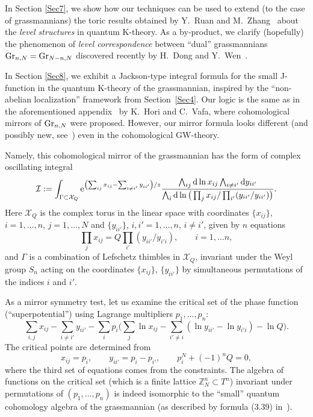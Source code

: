 \documentclass[pdftex]{sigma}
\numberwithin{equation}{section}
\def\I{\mathcal I}
\def\X{\mathcal X}
\def\ZZ{\mathbb Z}
\begin{document}
In Section \ref{Sec7}, we show how our techniques can be used to extend (to the case of grassmannians) the toric results obtained by Y.~Ruan and M.~Zhang~\cite{R-Z} about the {\em level structures} in quantum \mbox{K-theory}. As a by-product, we clarify (hopefully) the phenomenon of {\em level correspondence} between ``dual'' grassmannians ${\rm Gr}_{n,N}={\rm Gr}_{N-n,N}$ discovered recently by H.~Dong and Y.~Wen~\cite{Dong-Wen}.

In Section \ref{Sec8}, we exhibit a Jackson-type integral formula for the small J-function in the quantum K-theory of the grassmannian, inspired by the ``non-abelian localization'' framework from Section~\ref{Sec4}. Our logic is the same as in the aforementioned appendix~\cite{Hori-Vafa} by K.~Hori and C.~Vafa, where cohomological mirrors of ${\rm Gr}_{n,N}$ were proposed. However, our mirror formula looks different (and possibly new, see~\cite{M-R}) even in the cohomological GW-theory.

Namely, this cohomological mirror of the grassmannian has the form of complex oscillating integral
\[
\I:=\int_{\Gamma\subset \X_{Q}} {\rm e}^{\left(\sum_{ij} x_{ij}-\sum_{i\neq i'}y_{ii'}\right)/z} \frac{\bigwedge_{ij} {\rm d}\ln x_{ij} \bigwedge_{i\neq i'}{\rm d}y_{ii'}}{\bigwedge_i {\rm d}\ln \big(\prod_jx_{ij}/\prod_{i'}(y_{ii'}/y_{ii'})\big)}.
\]
Here $\X_{Q}$ is the complex torus in the linear space with coordinates $\{ x_{ij}\}$, $i=1,\dots,n$, $j=1,\dots, N$ and $\{ y_{ii'}\}$, $i,i'=1,\dots,n$, $i\neq i'$, given by $n$ equations
\[
\prod_j x_{ij}=Q \prod_{i'}(y_{ii'}/y_{i'i}), \qquad i=1,\dots n,
\]
and $\Gamma$ is a combination of Lefschetz thimbles in $\X_{Q}$, invariant under the Weyl group $S_n$ acting on the coordinates $\{ x_{ij} \}$, $\{y_{ii'} \}$ by simultaneous permutations of the indices $i$ and $i'$.

As a mirror symmetry test, let us examine the critical set of the phase function (``superpotential'') using Lagrange multipliers $p_1,\dots, p_n$:
\[
\sum_{i,j}x_{ij}-\sum_{i\neq i'}y_{ii'}-\sum_i p_i\bigg(\sum_j\ln x_{ij} -\sum_{i'\neq i} (\ln y_{ii'}-\ln y_{i'i})-\ln Q\bigg).
\]
The critical points are determined from
\[
x_{ij}=p_i,\qquad y_{ii'}=p_i-p_{i'},\qquad p_i^N+(-1)^nQ=0,
\]
where the third set of equations comes from the constraints. The algebra of functions on the critical set (which is a finite lattice $\ZZ_N^n\subset T^n$) invariant under permutations of $(p_1,\dots,p_n)$
is indeed isomorphic to the ``small'' quantum cohomology algebra of the grassmannian (as described by formula (3.39) in~\cite{Witten}).
\end{document}
